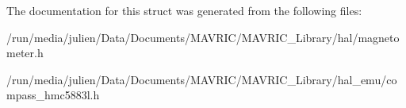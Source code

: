 The documentation for this struct was generated from the following files\+:\begin{DoxyCompactItemize}
\item 
/run/media/julien/\+Data/\+Documents/\+M\+A\+V\+R\+I\+C/\+M\+A\+V\+R\+I\+C\+\_\+\+Library/hal/magnetometer.\+h\item 
/run/media/julien/\+Data/\+Documents/\+M\+A\+V\+R\+I\+C/\+M\+A\+V\+R\+I\+C\+\_\+\+Library/hal\+\_\+emu/compass\+\_\+hmc5883l.\+h\end{DoxyCompactItemize}
